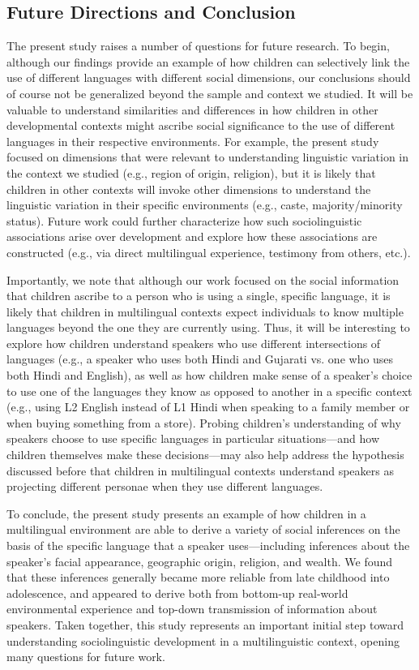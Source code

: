 \documentclass{foushee-adapted-preprint}
\begin{document}
\subsection{Future Directions and Conclusion}
The present study raises a number of questions for future research. To begin, although our findings provide an example of how children can selectively link the use of different languages with different social dimensions, our conclusions should of course not be generalized beyond the sample and context we studied. It will be valuable to understand similarities and differences in how children in other developmental contexts might ascribe social significance to the use of different languages in their respective environments. For example, the present study focused on dimensions that were relevant to understanding linguistic variation in the context we studied (e.g., region of origin, religion), but it is likely that children in other contexts will invoke other dimensions to understand the linguistic variation in their specific environments (e.g., caste, majority/minority status). Future work could further characterize how such sociolinguistic associations arise over development and explore how these associations are constructed (e.g., via direct multilingual experience, testimony from others, etc.).

Importantly, we note that although our work focused on the social information that children ascribe to a person who is using a single, specific language, it is likely that children in multilingual contexts expect individuals to know multiple languages beyond the one they are currently using. Thus, it will be interesting to explore how children understand speakers who use different intersections of languages (e.g., a speaker who uses both Hindi and Gujarati vs. one who uses both Hindi and English), as well as how children make sense of a speaker's choice to use one of the languages they know as opposed to another in a specific context (e.g., using L2 English instead of L1 Hindi when speaking to a family member or when buying something from a store). 
Probing children's understanding of why speakers choose to use specific languages in particular situations---and how children themselves make these decisions---may also help address the hypothesis discussed before that children in multilingual contexts understand speakers as projecting different personae when they use different languages.

To conclude, the present study presents an example of how children in a multilingual environment are able to derive a variety of social inferences on the basis of the specific language that a speaker uses—including inferences about the speaker's facial appearance, geographic origin, religion, and wealth. We found that these inferences generally became more reliable from late childhood into adolescence, and appeared to derive both from bottom-up real-world environmental experience and top-down transmission of information about speakers. Taken together, this study represents an important initial step toward understanding sociolinguistic development in a multilinguistic context, opening many questions for future work.\\
\end{document}
